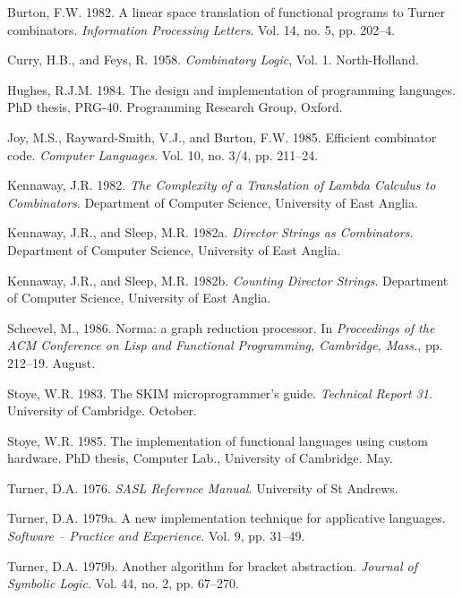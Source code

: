 \begin{references}

    \item Burton, F.W. 1982. A linear space translation of functional programs to Turner combinators. \textit{Information Processing Letters}. Vol. 14, no. 5, pp. 202--4.

    \item Curry, H.B., and Feys, R. 1958. \textit{Combinatory Logic}, Vol. 1. North-Holland.

    \item Hughes, R.J.M. 1984. The design and implementation of programming languages. PhD thesis, PRG-40. Programming Research Group, Oxford.

    \item Joy, M.S., Rayward-Smith, V.J., and Burton, F.W. 1985. Efficient combinator code. \textit{Computer Languages}. Vol. 10, no. 3/4, pp. 211--24.

    \item Kennaway, J.R. 1982. \textit{The Complexity of a Translation of Lambda Calculus to Combinators}. Department of Computer Science, University of East Anglia.

    \item Kennaway, J.R., and Sleep, M.R. 1982a. \textit{Director Strings as Combinators}. Department of Computer Science, University of East Anglia.

    \item Kennaway, J.R., and Sleep, M.R. 1982b. \textit{Counting Director Strings}. Department of Computer Science, University of East Anglia.

    \item Scheevel, M., 1986. Norma: a graph reduction processor. In \textit{Proceedings of the ACM Conference on Lisp and Functional Programming, Cambridge, Mass.}, pp. 212--19. August.

    \item Stoye, W.R. 1983. The SKIM microprogrammer's guide. \textit{Technical Report 31}. University of Cambridge. October.

    \item Stoye, W.R. 1985. The implementation of functional languages using custom hardware. PhD thesis, Computer Lab., University of Cambridge. May.

    \item Turner, D.A. 1976. \textit{SASL Reference Manual}. University of St Andrews.

    \item Turner, D.A. 1979a. A new implementation technique for applicative languages. \textit{Software -- Practice and Experience}. Vol. 9, pp. 31--49.

    \item Turner, D.A. 1979b. Another algorithm for bracket abstraction. \textit{Journal of Symbolic Logic}. Vol. 44, no. 2, pp. 67--270.

\end{references}